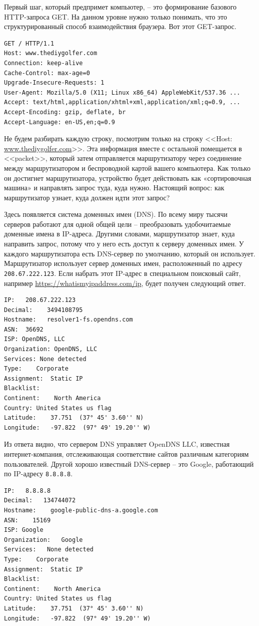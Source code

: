 \documentclass[12pt]{article}
\begin{document}
Первый шаг, который предпримет компьютер, -- это формирование базового
HTTP-запроса GET. На данном уровне нужно только
понимать, что это структурированный способ взаимодействия браузера. Вот
этот GET-запрос.
\begin{verbatim}
GET / HTTP/1.1
Host: www.thediygolfer.com
Connection: keep-alive
Cache-Control: max-age=0
Upgrade-Insecure-Requests: 1
User-Agent: Mozilla/5.0 (X11; Linux x86_64) AppleWebKit/537.36 ...
Accept: text/html,application/xhtml+xml,application/xml;q=0.9, ...
Accept-Encoding: gzip, deflate, br
Accept-Language: en-US,en;q=0.9
\end{verbatim}

Не будем разбирать каждую строку, посмотрим только на строку <<Host:
\href{http://www.thediygolfer.com}{www.thediygolfer.com}>>. Эта
информация вместе с остальной помещается в <<packet>>, который затем
отправляется маршрутизатору через соединение между маршрутизатором и
беспроводной картой вашего компьютера. Как только он достигнет
маршрутизатора, устройство будет действовать как «сортировочная машина»
и направлять запрос туда, куда нужно. Настоящий вопрос: как
маршрутизатор узнает, куда должен идти этот запрос?

Здесь появляется система доменных имен (DNS). По всему миру
тысячи серверов работают для одной общей цели -- преобразовать
удобочитаемые доменные имена в IP-адреса. Другими словами, маршрутизатор
знает, куда направить запрос, потому что у него есть доступ к серверу
доменных имен. У каждого маршрутизатора есть DNS-сервер по умолчанию,
который он использует. Маршрутизатор использует сервер доменных
имен, расположенный по адресу \texttt{208.67.222.123}. Если набрать этот
IP-адрес в специальном поисковый сайт, например
\url{https://whatismyipaddress.com/ip}, будет получен следующий ответ.
\begin{verbatim}
IP:   208.67.222.123
Decimal:    3494108795
Hostname:   resolver1-fs.opendns.com
ASN:  36692
ISP: OpenDNS, LLC
Organization: OpenDNS, LLC
Services: None detected
Type:    Corporate
Assignment:  Static IP
Blacklist:
Continent:    North America
Country: United States us flag
Latitude:    37.751  (37° 45' 3.60'' N)
Longitude:   -97.822  (97° 49' 19.20'' W)
\end{verbatim}

Из ответа видно, что сервером DNS управляет OpenDNS LLC, известная
интернет-компания, отслеживающая соответствие сайтов различным категориям пользователей.
Другой хорошо известный DNS-сервер -- это Google, работающий
по IP-адресу \texttt{8.8.8.8}.
\begin{verbatim}
IP:   8.8.8.8
Decimal:   134744072
Hostname:    google-public-dns-a.google.com
ASN:    15169
ISP: Google
Organization:   Google
Services:   None detected
Type:    Corporate
Assignment:  Static IP
Blacklist:
Continent:    North America
Country: United States us flag
Latitude:    37.751  (37° 45' 3.60'' N)
Longitude:   -97.822  (97° 49' 19.20'' W)
\end{verbatim}
\end{document}
